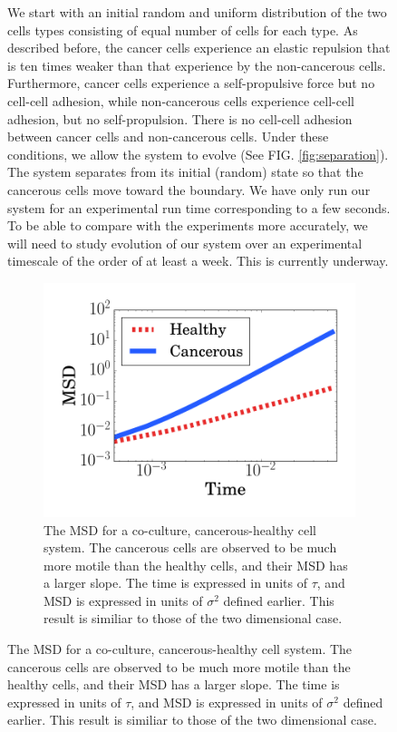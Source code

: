 \documentclass[aps,prb,twocolumn,groupedaddress,nofootinbib,floatfix]{revtex4}
\begin{document}
\begin{figure}
We start with an initial random and uniform distribution of the two cells types consisting of  
equal number of cells for each type. As described before, the cancer cells experience an elastic
repulsion that is ten times weaker than that experience by the non-cancerous cells. Furthermore, 
cancer cells experience a self-propulsive force but no cell-cell adhesion, while non-cancerous cells
experience cell-cell adhesion, but no self-propulsion. There is no cell-cell adhesion between cancer cells
and non-cancerous cells.  Under these conditions, we allow the system to evolve (See
FIG. \ref{fig:separation}). The system separates from its initial (random) state
so that the cancerous cells move toward the boundary. We have only run our system for an experimental run time
corresponding to a few seconds. To be able to compare with the experiments more accurately, we will need to study evolution
of our system over an experimental timescale of the order of at least a week. This is currently underway. 

\begin{figure}
  \includegraphics[width=\columnwidth]{cocultureMSD.png}
  \caption[cocultureMSD]
    {The MSD for a co-culture, cancerous-healthy cell system. The cancerous cells
    are observed to be much more motile than the healthy cells, and their MSD has a larger slope. The time is expressed in units of $\tau$, and MSD is expressed
    in units of $\sigma^2$ defined earlier. This result is
    similiar to those of the two dimensional case\cite{Butcher}.}
  \label{fig:cocultureMSD}
\end{figure}


\end{figure}
\end{document}

